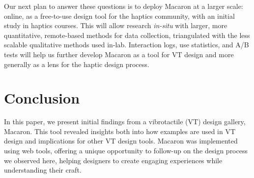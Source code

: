 Our next plan to answer these questions is to deploy Macaron at a larger scale: online, as a free-to-use design tool for the haptics community, with an initial study in haptics courses.
This will allow research \emph{in-situ} with larger, more quantitative, remote-based methods for data collection, triangulated with the less scalable qualitative methods used in-lab.
Interaction logs, use statistics, and A/B tests will help us further develop Macaron as  a tool for VT design and more generally as a lens for the haptic design process.


\section{Conclusion}
In this paper, we present initial findings from a vibrotactile (VT) design gallery, Macaron.
This tool revealed insights both into how examples are used in VT design and implications for other VT design tools.
Macaron was implemented using web tools, offering a unique opportunity to follow-up on the design process we observed here, helping designers to create engaging experiences while understanding their craft.


\endinput
